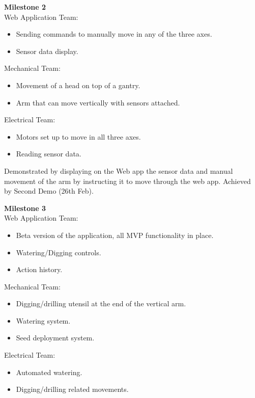 \documentclass{article}
\begin{document}
              
\textbf{Milestone 2} \\
Web Application Team:
\begin{itemize}
    \vspace{-3mm}
    \setlength\itemsep{-0.6em}
    \item Sending commands to manually move in any of the three axes.
    \item Sensor data display.
    \vspace{-3mm}
\end{itemize}
Mechanical Team:
\begin{itemize}
    \vspace{-3mm}
    \setlength\itemsep{-0.6em}
    \item Movement of a head on top of a gantry.
    \item Arm that can move vertically with sensors attached.
    \vspace{-3mm}
\end{itemize}
Electrical Team:
\begin{itemize}
    \vspace{-3mm}
    \setlength\itemsep{-0.6em}
    \item Motors set up to move in all three axes.
    \item Reading sensor data.
    \vspace{-3mm}
\end{itemize}

Demonstrated by displaying on the Web app the sensor data and manual movement of the arm by instructing it to move through the web app. Achieved by Second Demo (26th Feb).
  

\textbf{Milestone 3} \\
Web Application Team:
\begin{itemize}
    \vspace{-3mm}
    \setlength\itemsep{-0.6em}
    \item Beta version of the application, all MVP functionality in place.
    \item Watering/Digging controls.
    \item Action history.
    \vspace{-3mm}
\end{itemize}
Mechanical Team:
\begin{itemize}
    \vspace{-3mm}
    \setlength\itemsep{-0.6em}
    \item Digging/drilling utensil at the end of the vertical arm.
    \item Watering system.
    \item Seed deployment system.
    \vspace{-3mm}
\end{itemize}
Electrical Team:
\begin{itemize}
    \vspace{-3mm}
    \setlength\itemsep{-0.6em}
    \item Automated watering.
    \item Digging/drilling related movements.
    \vspace{-3mm}
\end{itemize}
\end{document}
